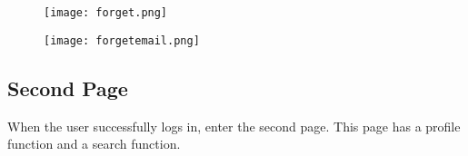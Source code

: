 \documentclass[conference]{IEEEtran}
\begin{document}
        \begin{figure}[h]
        \begin{center}
        \centering
        \texttt{[image: forget.png]}
        \caption{}
        \label{fig:my_label}
        \end{center}
        \end{figure}
        
        \begin{figure}[h]
        \begin{center}
        \centering
        \texttt{[image: forgetemail.png]}
        \caption{}
        \label{fig:my_label}
        \end{center}
        \end{figure}
        
      
    \subsection{Second Page}
    
    When the user successfully logs in, enter the second page. This page has a profile function and a search function.
        
\end{document}
